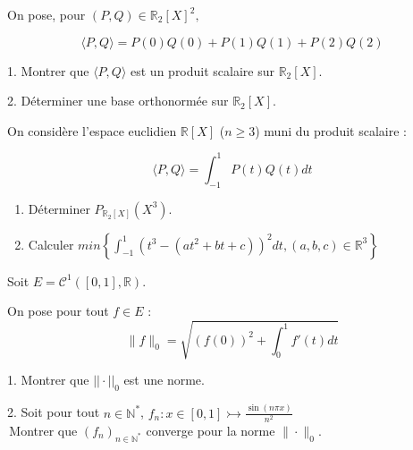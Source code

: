 \noindent On pose, pour $(P,Q) \in \mathbb{R}_2[X]^2,$

\vspace{-15pt}
\begin{equation*}
    \langle {P, Q} \rangle = P(0)Q(0) + P(1)Q(1) + P(2)Q(2)
\end{equation*}
\vspace{-15pt}

1. Montrer que $\langle {P, Q} \rangle$ est un produit scalaire sur $\mathbb{R}_2[X]$.

\vspace{1pt}
2. Déterminer une base orthonormée sur $\mathbb{R}_2[X]$.

\subetoiles

\noindent On considère l'espace euclidien $\mathbb{R}[X]$ ($n \geqslant 3$) muni du produit scalaire :

\vspace{-15pt}
\begin{equation*}
    \langle {P, Q} \rangle = \int_{-1}^{1}P(t)Q(t)dt
\end{equation*}
\begin{enumerate}
    \vspace*{-10pt}
    \item Déterminer $\displaystyle P_{\mathbb{R}_2[X]}(X^3)$.
    \vspace*{-5pt}
    \item Calculer $\displaystyle min\left\{\int_{-1}^{1}{(t^3 - (at^2 + bt + c))^2dt, (a,b,c) \in \mathbb{R}^3}\right\}$
\end{enumerate}

\subetoiles

\noindent Soit $E = \mathcal{C}^1([0,1], \mathbb{R})$.

\noindent On pose pour tout $f \in E$ :
\begin{equation*}
    \|f\|_0 = \sqrt{(f(0))^2 + \int_{0}^{1} f'(t)dt}
\end{equation*}

1. Montrer que $||\cdot||_0$ est une norme.

2. Soit pour tout $n \in \mathbb{N}^*$, $\displaystyle f_n : x \in [0,1] \rightarrowtail \frac {\sin(n\pi x)} {n^2}$ \\
\indent \quad \,Montrer que $(f_n)_{n \in \mathbb{N}^*}$ converge pour la norme $\|\cdot\|_0$.